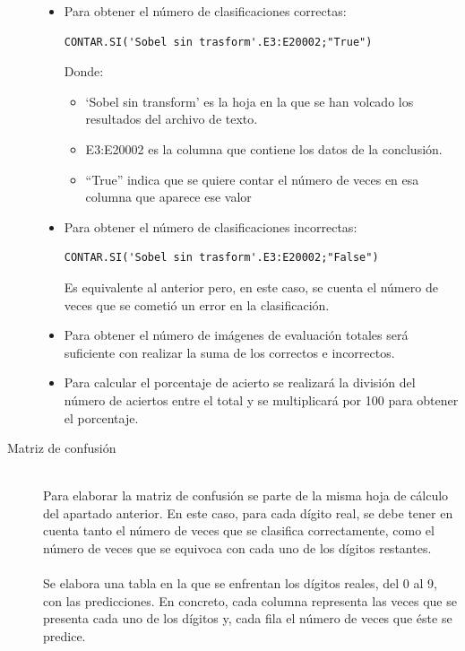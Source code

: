 \begin{description}
	\begin{itemize}
		\item{Para obtener el número de clasificaciones correctas:
		\vspace{10pt}
		\begin{lstlisting}[frame=single]
	CONTAR.SI('Sobel sin trasform'.E3:E20002;"True")
		\end{lstlisting}
		Donde:
		\begin{itemize}
			\item `Sobel sin transform' es la hoja en la que se han volcado los resultados del archivo de texto.
			\item E3:E20002 es la columna que contiene los datos de la conclusión.
			\item ``True'' indica que se quiere contar el número de veces en esa columna que aparece ese valor
		\end{itemize}
	}
	\item{Para obtener el número de clasificaciones incorrectas:
		\vspace{10pt}
		\begin{lstlisting}[frame=single]
	CONTAR.SI('Sobel sin trasform'.E3:E20002;"False")
		\end{lstlisting}
		Es equivalente al anterior pero, en este caso, se cuenta el número de veces que se cometió un error en la clasificación.
	}
	\item{Para obtener el número de imágenes de evaluación totales será suficiente con realizar la suma de los correctos e incorrectos.
	}
	\item{Para calcular el porcentaje de acierto se realizará la división del número de aciertos entre el total y se multiplicará por 100 para obtener el porcentaje.
	}
	\end{itemize}
	\vspace{5pt}
	\item[Matriz de confusión] \hfill 
	\vspace{5pt}
	\\
	Para elaborar la matriz de confusión se parte de la misma hoja de cálculo del apartado anterior. En este caso, para cada dígito real, se debe tener en cuenta tanto el número de veces que se clasifica correctamente, como el número de veces que se equivoca con cada uno de los dígitos restantes.\\
	\vspace{-10pt}
	\\
	Se elabora una tabla en la que se enfrentan los dígitos reales, del 0 al 9, con las predicciones. En concreto, cada columna representa las veces que se presenta cada uno de los dígitos y, cada fila el número de veces que éste se predice.\\

\end{description}
